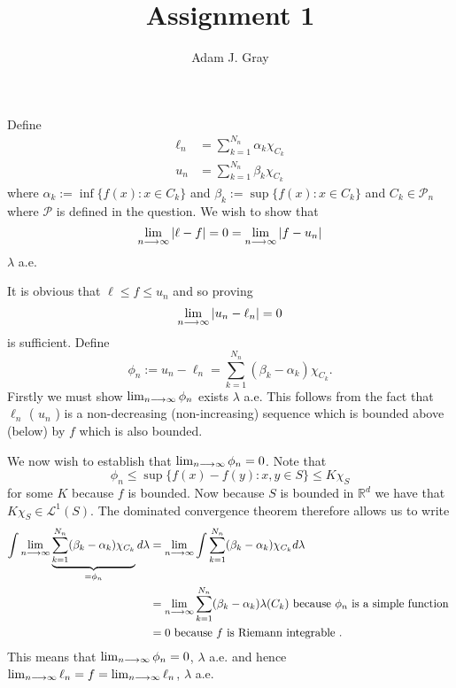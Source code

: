 \documentclass{unswmaths}
\begin{document}
\author{Adam J. Gray}
\title{Assignment 1}
\subject{Measure Theory}

\newcommand{\llra}{\Leftrightarrow}

\unswtitle

\section{}
\subsection{}
Define
\begin{align*}
    \ell_n &= \sum_{k=1}^{N_n} \alpha_k \chi_{C_k} \\
    u_n &= \sum_{k=1}^{N_n} \beta_k \chi_{C_k} 
\end{align*}
where $ \alpha_k := \inf\{ f(x) : x \in C_k \} $ and $ \beta_k := \sup\{ f(x) : x \in C_k \} $ and $ C_k \in \mathcal{P}_n $ where $ \mathcal{P} $ is defined in the question.
We wish to show that $$ \lim_{n\longrightarrow\infty} | \ell - f | = 0 = \lim_{n\longrightarrow\infty} | f - u_n | $$  $ \lambda $ a.e.

It is obvious that $ \ell \leq f \leq u_n $ and so proving $$ \lim_{n\longrightarrow\infty} |u_n - \ell_n| = 0 $$ is sufficient.
Define $$ \phi_n := u_n - \ell_n = \sum_{k=1}^{N_n} (\beta_k - \alpha_k) \chi_{C_k}. $$
Firstly we must show $ \lim_{n\longrightarrow\infty} \phi_n $ exists $ \lambda $ a.e. This follows from the fact that $ \ell_n $ ( $u_n$ ) is a non-decreasing (non-increasing) sequence which is bounded above (below) by $ f $ which is also bounded. 

We now wish to establish that $ \lim_{n\longrightarrow\infty} \phi_n = 0 $. Note that 
$$
    \phi_n \leq \sup\{ f(x)-f(y) : x,y \in S \} \leq K\chi_{S}
$$
for some $ K $ because $ f $ is bounded. Now because $ S $ is bounded in $ \mathbb{R}^d $ we have that $ K\chi_S \in \mathcal{L}^1(S) $. The dominated convergence theorem therefore allows us to write  
\begin{align*}
    \int \lim_{n\longrightarrow\infty} \underbrace{\sum_{k=1}^{N_n}(\beta_k - \alpha_k) \chi_{C_k}}_{=\phi_n} d\lambda &=
        \lim_{n \longrightarrow\infty} \int \sum_{k=1}^{N_n} (\beta_k - \alpha_k) \chi_{C_k} d\lambda \\
    &=  \lim_{n \longrightarrow\infty} \sum_{k=1}^{N_n} (\beta_k - \alpha_k) \lambda(C_k) \text{ because } \phi_n \text{ is a simple function }\\
    &= 0 \text{ because } f \text{ is Riemann integrable }.
\end{align*}
This means that $ \lim_{n\longrightarrow\infty} \phi_n = 0 $, $ \lambda $ a.e. and hence $ \lim_{n\longrightarrow\infty} \ell_n = f = \lim_{n\longrightarrow\infty} \ell_n $, $ \lambda $ a.e.
\end{document}
